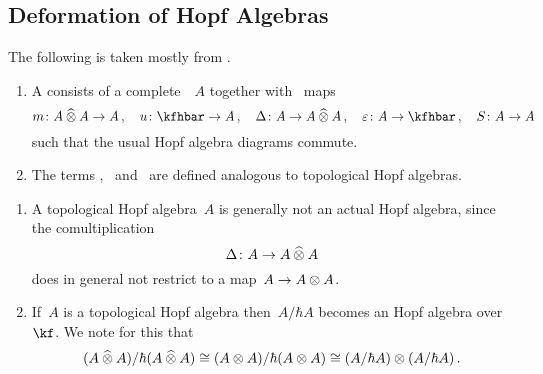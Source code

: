 \documentclass[a4paper, 11pt, oneside]{scrartcl}
\begin{document}


\subsection{Deformation of Hopf Algebras}

The following is taken mostly from \cite[Chapter~6]{guide_to_quantum_groups}.

\begin{definition}
  \label{topological definitions}
  \begin{enumerate}
    \item
      A  consists of a complete~\module{$\kfhbar$}~$A$ together with~\linear{$\kfhbar$} maps
      \[
        m \colon A \ctensor A \to A \,,
        \quad
        u \colon \kfhbar \to A \,,
        \quad
        \Delta \colon A \to A \ctensor A \,,
        \quad
        \varepsilon \colon A \to \kfhbar \,,
        \quad
        S \colon A \to A
      \]
      such that the usual Hopf algebra diagrams commute.
    \item
      The terms ,~ and~ are defined analogous to topological Hopf algebras.
  \end{enumerate}
\end{definition}

\begin{remark}
  \leavevmode
  \begin{enumerate}
    \item
      A topological Hopf algebra~$A$ is generally not an actual Hopf algebra, since the comultiplication
      \[
        \Delta
        \colon
        A
        \to
        A \mathbin{\widehat{\otimes}} A
      \]
      does in general not restrict to a map~$A \to A \otimes A$.
    \item
      If~$A$ is a topological Hopf algebra then~$A / \hbar A$ becomes an Hopf algebra over~$\kf$.
      We note for this that
      \[
        (A \mathbin{\widehat{\otimes}} A) / \hbar (A \mathbin{\widehat{\otimes}} A)
        \cong
        (A \otimes A) / \hbar (A \otimes A)
        \cong
        (A / \hbar A) \otimes (A / \hbar A) \,.
      \]
  \end{enumerate}
\end{remark}
\end{document}
